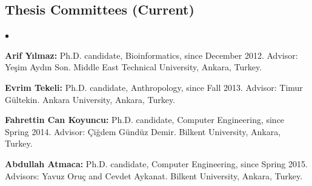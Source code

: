 \documentclass[margin,line]{res}
\newenvironment{list2}{
  \begin{list}{$\bullet$}{%
      \setlength{\itemsep}{0in}
      \setlength{\parsep}{0in} \setlength{\parskip}{0in}
      \setlength{\topsep}{0in} \setlength{\partopsep}{0in} 
      \setlength{\leftmargin}{0.2in}}}{\end{list}}
\begin{document}
\begin{resume}
\vspace*{-.6cm}
\subsection{\small \sc Thesis Committees (Current)}
\begin{list2}
\item
  {\bf Arif Yılmaz:} Ph.D. candidate, Bioinformatics, since December 2012.
  Advisor: Yeşim Aydın Son.
  Middle East Technical University, Ankara, Turkey.
\item 
  {\bf Evrim Tekeli:} Ph.D. candidate, Anthropology, since Fall 2013.
  Advisor: Timur G\"{u}ltekin.
  Ankara University, Ankara, Turkey. 
\item
  {\bf Fahrettin Can Koyuncu:} Ph.D. candidate, Computer Engineering, since Spring 2014.
  Advisor: Çiğdem Gündüz Demir.
  Bilkent University, Ankara, Turkey.
\item
  {\bf Abdullah Atmaca:} Ph.D. candidate, Computer Engineering, since Spring 2015.
  Advisors: Yavuz Oruç and Cevdet Aykanat.
  Bilkent University, Ankara, Turkey.
\end{list2}


\vspace*{-.6cm}

\end{resume}
\end{document}
